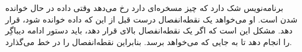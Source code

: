 \section{}
\paragraph{}\label{answer:81}
برنامه‌نویس شک دارد که چیز مسخره‌ای دارد رخ می‌دهد وقتی داده  در حال خوانده شدن است. او می‌خواهد یک نقطه‌انفصال درست قبل از این که داده خوانده شود، قرار دهد. مشکل این است که اگر یک نقطه‌انفصال بالای  قرار دهد، باید  دستور ادامه دیباگِر را انجام دهد تا به جایی که می‌خواهد برسد. بنابراین نقطه‌انفصال را در خط  می‌گذارد.